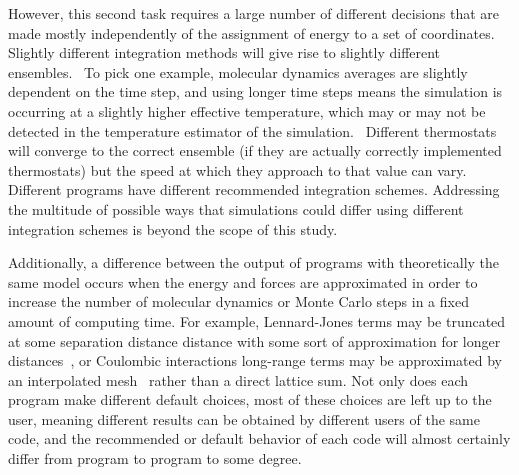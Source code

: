 However, this second task requires a large number of different
decisions that are made mostly independently of the assignment of
energy to a set of coordinates.  Slightly different integration
methods will give rise to slightly different
ensembles.~\citep{???} To pick one example, molecular dynamics
averages are slightly dependent on the time step, and using longer
time steps means the simulation is occurring at a slightly higher
effective temperature, which may or may not be detected in the
temperature estimator of the simulation.~\citep{???} Different
thermostats will converge to the correct ensemble (if they are
actually correctly implemented thermostats) but the speed at which
they approach to that value can vary. Different programs have
different recommended integration schemes. Addressing the multitude of
possible ways that simulations could differ using different
integration schemes is beyond the scope of this study.


Additionally, a difference between the output of programs with
theoretically the same model occurs when the energy and forces are
approximated in order to increase the number of molecular dynamics or
Monte Carlo steps in a fixed amount of computing time. For example,
Lennard-Jones terms may be truncated at some separation distance
distance with some sort of approximation for longer
distances~\citep{AllenAndTildesley,shirts_accurate_2007,wu_isotropic_2005},
or Coulombic interactions long-range terms may be approximated by an
interpolated mesh~\citep{essmann_smooth_1995} rather than a direct
lattice sum.  Not only does each program make different default
choices, most of these choices are left up to the user, meaning
different results can be obtained by different users of the same code,
and the recommended or default behavior of each code will almost
certainly differ from program to program to some degree.

